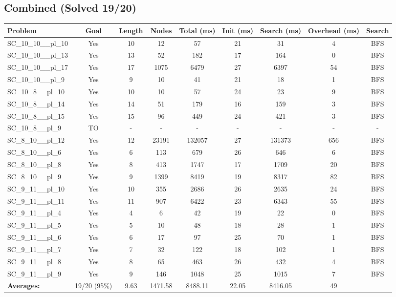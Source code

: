 \documentclass{article}
\begin{document}
\subsection*{Combined (Solved 19/20)}
\begin{tabular}{lcccccccc}
\toprule
Problem & Goal & Length & Nodes & Total (ms) & Init (ms) & Search (ms) & Overhead (ms) & Search \\
\midrule
SC\_10\_10\_\_pl\_10 & Yes & 10 & 12 & 57 & 21 & 31 & 4 & BFS \\
SC\_10\_10\_\_pl\_13 & Yes & 13 & 52 & 182 & 17 & 164 & 0 & BFS \\
SC\_10\_10\_\_pl\_17 & Yes & 17 & 1075 & 6479 & 27 & 6397 & 54 & BFS \\
SC\_10\_10\_\_pl\_9 & Yes & 9 & 10 & 41 & 21 & 18 & 1 & BFS \\
SC\_10\_8\_\_pl\_10 & Yes & 10 & 10 & 57 & 24 & 23 & 9 & BFS \\
SC\_10\_8\_\_pl\_14 & Yes & 14 & 51 & 179 & 16 & 159 & 3 & BFS \\
SC\_10\_8\_\_pl\_15 & Yes & 15 & 96 & 449 & 24 & 421 & 3 & BFS \\
SC\_10\_8\_\_pl\_9 & TO & - & - & - & - & - & - & - \\
SC\_8\_10\_\_pl\_12 & Yes & 12 & 23191 & 132057 & 27 & 131373 & 656 & BFS \\
SC\_8\_10\_\_pl\_6 & Yes & 6 & 113 & 679 & 26 & 646 & 6 & BFS \\
SC\_8\_10\_\_pl\_8 & Yes & 8 & 413 & 1747 & 17 & 1709 & 20 & BFS \\
SC\_8\_10\_\_pl\_9 & Yes & 9 & 1399 & 8419 & 19 & 8317 & 82 & BFS \\
SC\_9\_11\_\_pl\_10 & Yes & 10 & 355 & 2686 & 26 & 2635 & 24 & BFS \\
SC\_9\_11\_\_pl\_11 & Yes & 11 & 907 & 6422 & 23 & 6343 & 55 & BFS \\
SC\_9\_11\_\_pl\_4 & Yes & 4 & 6 & 42 & 19 & 22 & 0 & BFS \\
SC\_9\_11\_\_pl\_5 & Yes & 5 & 10 & 48 & 18 & 28 & 1 & BFS \\
SC\_9\_11\_\_pl\_6 & Yes & 6 & 17 & 97 & 25 & 70 & 1 & BFS \\
SC\_9\_11\_\_pl\_7 & Yes & 7 & 32 & 122 & 18 & 102 & 1 & BFS \\
SC\_9\_11\_\_pl\_8 & Yes & 8 & 65 & 463 & 26 & 432 & 4 & BFS \\
SC\_9\_11\_\_pl\_9 & Yes & 9 & 146 & 1048 & 25 & 1015 & 7 & BFS \\
\textbf{Averages:} & 19/20 (95\%) & 9.63 & 1471.58 & 8488.11 & 22.05 & 8416.05 & 49 & \\
\bottomrule
\end{tabular}
\\[0.7cm]
\end{document}
